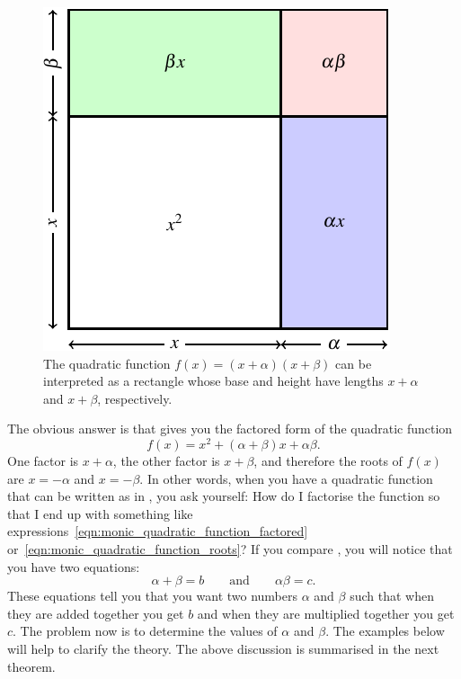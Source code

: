 \documentclass[a4paper,oneside,12pt]{article}
\begin{document}
\begin{figure}[!htbp]
\centering
\includegraphics[scale=1.1]{image/08/quadratic-as-square.pdf}
\caption{%
  The quadratic function $f(x) = (x + \alpha)(x + \beta)$ can be
  interpreted as a rectangle whose base and height have lengths
  $x + \alpha$ and $x + \beta$, respectively.
}
\label{fig:quadratic_as_rectangle}
\end{figure}

The obvious answer is that
 gives you the
factored form of the quadratic function
\begin{equation}
\label{eqn:monic_quadratic_function_roots}
f(x)
=
x^2 + (\alpha + \beta)x + \alpha\beta.
\end{equation}
One factor is $x + \alpha$, the other factor is $x + \beta$, and
therefore the roots of $f(x)$ are $x = -\alpha$ and $x = -\beta$.  In
other words, when you have a quadratic function that can be written as
in , you ask yourself: How do
I factorise the function so that I end up with something like
expressions~\eqref{eqn:monic_quadratic_function_factored}
or~\eqref{eqn:monic_quadratic_function_roots}?  If you compare
,
you will notice that you have two equations:
\begin{equation}
\label{eqn:monic_quadratic_function_factors_sum_product}
\alpha + \beta
=
b
\qquad
\text{and}
\qquad
\alpha\beta
=
c.
\end{equation}
These equations tell you that you want two numbers $\alpha$ and
$\beta$ such that when they are added together you get $b$ and when
they are multiplied together you get $c$.  The problem now is to
determine the values of $\alpha$ and $\beta$.  The examples below will
help to clarify the theory.  The above discussion is summarised in the
next theorem.
\end{document}
